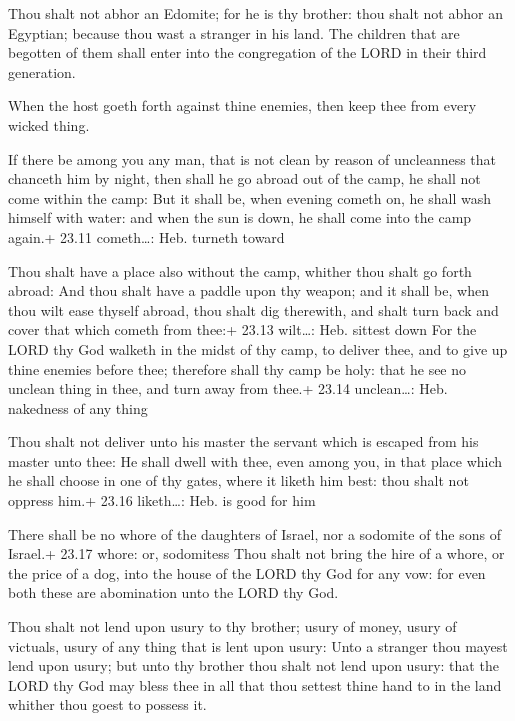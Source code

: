  Thou shalt not abhor an Edomite; for he is thy brother:
thou shalt not abhor an Egyptian; because thou wast a stranger in his
land.  The children that are begotten of them shall enter
into the congregation of the LORD in their third generation.

 When the host goeth forth against thine enemies, then
keep thee from every wicked thing.

 If there be among you any man, that is not clean by
reason of uncleanness that chanceth him by night, then shall he go
abroad out of the camp, he shall not come within the camp: 
But it shall be, when evening cometh on, he shall wash himself with
water: and when the sun is down, he shall come into the camp again.+
23.11 cometh\ldots: Heb. turneth toward

 Thou shalt have a place also without the camp, whither
thou shalt go forth abroad:  And thou shalt have a paddle
upon thy weapon; and it shall be, when thou wilt ease thyself abroad,
thou shalt dig therewith, and shalt turn back and cover that which
cometh from thee:+ 23.13 wilt\ldots: Heb. sittest down  For
the LORD thy God walketh in the midst of thy camp, to deliver thee, and
to give up thine enemies before thee; therefore shall thy camp be holy:
that he see no unclean thing in thee, and turn away from thee.+ 23.14
unclean\ldots: Heb. nakedness of any thing

 Thou shalt not deliver unto his master the servant which
is escaped from his master unto thee:  He shall dwell with
thee, even among you, in that place which he shall choose in one of thy
gates, where it liketh him best: thou shalt not oppress him.+ 23.16
liketh\ldots: Heb. is good for him

 There shall be no whore of the daughters of Israel, nor
a sodomite of the sons of Israel.+ 23.17 whore: or, sodomitess
 Thou shalt not bring the hire of a whore, or the price of
a dog, into the house of the LORD thy God for any vow: for even both
these are abomination unto the LORD thy God.

 Thou shalt not lend upon usury to thy brother; usury of
money, usury of victuals, usury of any thing that is lent upon usury:
 Unto a stranger thou mayest lend upon usury; but unto thy
brother thou shalt not lend upon usury: that the LORD thy God may bless
thee in all that thou settest thine hand to in the land whither thou
goest to possess it.

